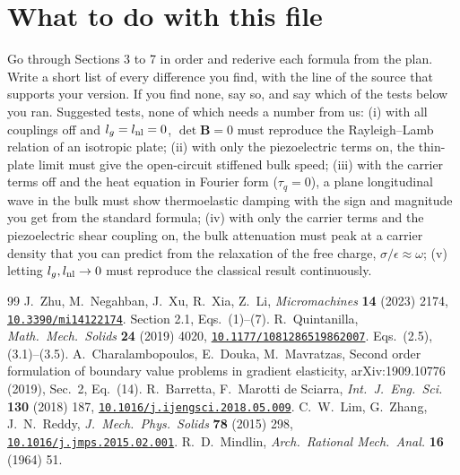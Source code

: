 \documentclass[11pt]{article}
\newcommand{\doi}[1]{\href{https://doi.org/#1}{\texttt{#1}}}
\begin{document}
\section{What to do with this file}

Go through Sections 3 to 7 in order and rederive each formula from the plan. Write a short list of every difference
you find, with the line of the source that supports your version. If you find none, say so, and say which of the
tests below you ran. Suggested tests, none of which needs a number from us:
(i) with all couplings off and $l_g=l_{\rm nl}=0$, $\det\mathbf B=0$ must reproduce the Rayleigh--Lamb relation
of an isotropic plate; (ii) with only the piezoelectric terms on, the thin-plate limit must give the
open-circuit stiffened bulk speed; (iii) with the carrier terms off and the heat equation in Fourier form
($\tau_q=0$), a plane longitudinal wave in the bulk must show thermoelastic damping with the sign and
magnitude you get from the standard formula; (iv) with only the carrier terms and the piezoelectric shear
coupling on, the bulk attenuation must peak at a carrier density that you can predict from the relaxation of the
free charge, $\sigma/\epsilon\approx\omega$; (v) letting $l_g,l_{\rm nl}\to0$ must reproduce the
classical result continuously.

\begin{thebibliography}{99}
\small
{} J.~Zhu, M.~Negahban, J.~Xu, R.~Xia, Z.~Li, \emph{Micromachines} \textbf{14} (2023) 2174, \doi{10.3390/mi14122174}. Section 2.1, Eqs.\ (1)--(7).
 R.~Quintanilla, \emph{Math.\ Mech.\ Solids} \textbf{24} (2019) 4020, \doi{10.1177/1081286519862007}. Eqs.\ (2.5), (3.1)--(3.5).
 A.~Charalambopoulos, E.~Douka, M.~Mavratzas, Second order formulation of boundary value problems in gradient elasticity, arXiv:1909.10776 (2019), Sec.~2, Eq.~(14).
 R.~Barretta, F.~Marotti de Sciarra, \emph{Int.\ J.\ Eng.\ Sci.} \textbf{130} (2018) 187, \doi{10.1016/j.ijengsci.2018.05.009}.
 C.~W.~Lim, G.~Zhang, J.~N.~Reddy, \emph{J.\ Mech.\ Phys.\ Solids} \textbf{78} (2015) 298, \doi{10.1016/j.jmps.2015.02.001}.
 R.~D.~Mindlin, \emph{Arch.\ Rational Mech.\ Anal.} \textbf{16} (1964) 51.
\end{thebibliography}
\end{document}
